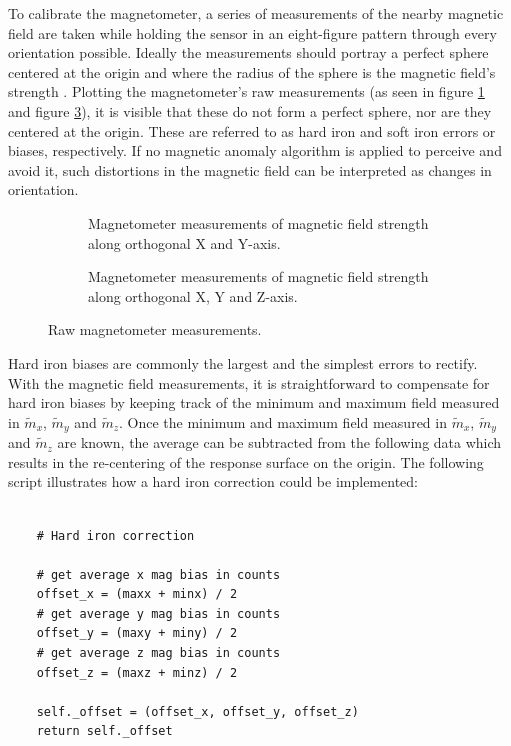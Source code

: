 To calibrate the magnetometer, a series of measurements of the nearby magnetic field are taken while holding the sensor in an eight-figure pattern through every orientation possible. Ideally the measurements should portray a perfect sphere centered at the origin and where the radius of the sphere is the magnetic field's strength \cite{kok2016magnetometer}. Plotting the magnetometer's raw measurements (as seen in figure \ref{plt:raw_magnetometer} and figure \ref{plt:raw_magnetometer3D}), it is visible that these do not form a perfect sphere, nor are they centered at the origin. These are referred to as hard iron and soft iron errors or biases, respectively. If no magnetic anomaly algorithm is applied to perceive and avoid it, such distortions in the magnetic field can be interpreted as changes in orientation.

\begin{figure}[!h]
    \centering
    \begin{subfigure}{0.7\textwidth}
        \centering
        \resizebox{1\linewidth}{!}{}
        \caption{Magnetometer measurements of magnetic field strength along orthogonal X and Y-axis.}
        \label{plt:raw_magnetometer}
    \end{subfigure}

    \begin{subfigure}{0.7\textwidth}
        \centering
        \resizebox{1\linewidth}{!}{}
        \caption{Magnetometer measurements of magnetic field strength along orthogonal X, Y and Z-axis.}
        \label{plt:raw_magnetometer3D}
    \end{subfigure}
    \caption{Raw magnetometer measurements.}
\end{figure}

Hard iron biases are commonly the largest and the simplest errors to rectify. With the magnetic field measurements, it is straightforward to compensate for hard iron biases by keeping track of the minimum and maximum field measured in $\widetilde{m}_x$, $\widetilde{m}_y$ and $\widetilde{m}_z$. Once the minimum and maximum field measured in $\widetilde{m}_x$, $\widetilde{m}_y$ and $\widetilde{m}_z$ are known, the average can be subtracted from the following data which results in the re-centering of the response surface on the origin. The following script illustrates how a hard iron correction could be implemented:

\lstset{language=Python}
\begin{lstlisting}[frame=single]  % Start your code-block

    # Hard iron correction

    # get average x mag bias in counts
    offset_x = (maxx + minx) / 2
    # get average y mag bias in counts
    offset_y = (maxy + miny) / 2
    # get average z mag bias in counts
    offset_z = (maxz + minz) / 2

    self._offset = (offset_x, offset_y, offset_z)
    return self._offset
\end{lstlisting}

